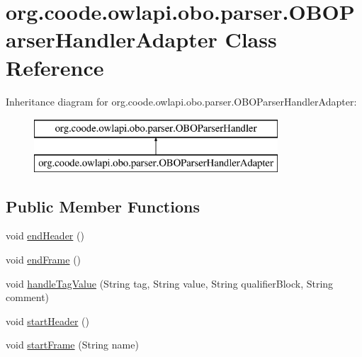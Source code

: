 \hypertarget{classorg_1_1coode_1_1owlapi_1_1obo_1_1parser_1_1_o_b_o_parser_handler_adapter}{\section{org.\-coode.\-owlapi.\-obo.\-parser.\-O\-B\-O\-Parser\-Handler\-Adapter Class Reference}
\label{classorg_1_1coode_1_1owlapi_1_1obo_1_1parser_1_1_o_b_o_parser_handler_adapter}
}
Inheritance diagram for org.\-coode.\-owlapi.\-obo.\-parser.\-O\-B\-O\-Parser\-Handler\-Adapter\-:\begin{figure}[H]
\begin{center}
\leavevmode
\includegraphics[height=2.000000cm]{classorg_1_1coode_1_1owlapi_1_1obo_1_1parser_1_1_o_b_o_parser_handler_adapter}
\end{center}
\end{figure}
\subsection*{Public Member Functions}
\begin{DoxyCompactItemize}
\item 
void \hyperlink{classorg_1_1coode_1_1owlapi_1_1obo_1_1parser_1_1_o_b_o_parser_handler_adapter_a616f73949ff7db0c917bbe0c7633d3a2}{end\-Header} ()
\item 
void \hyperlink{classorg_1_1coode_1_1owlapi_1_1obo_1_1parser_1_1_o_b_o_parser_handler_adapter_a158ae4b66f9f3650549c997b9e926fee}{end\-Frame} ()
\item 
void \hyperlink{classorg_1_1coode_1_1owlapi_1_1obo_1_1parser_1_1_o_b_o_parser_handler_adapter_a236759be90d75508fd1159281d3a004f}{handle\-Tag\-Value} (String tag, String value, String qualifier\-Block, String comment)
\item 
void \hyperlink{classorg_1_1coode_1_1owlapi_1_1obo_1_1parser_1_1_o_b_o_parser_handler_adapter_a746801b0b10e7947706f42cdde120f30}{start\-Header} ()
\item 
void \hyperlink{classorg_1_1coode_1_1owlapi_1_1obo_1_1parser_1_1_o_b_o_parser_handler_adapter_a5bc9e8f881304bf8257ae9e6ac23f4bc}{start\-Frame} (String name)
\end{DoxyCompactItemize}


